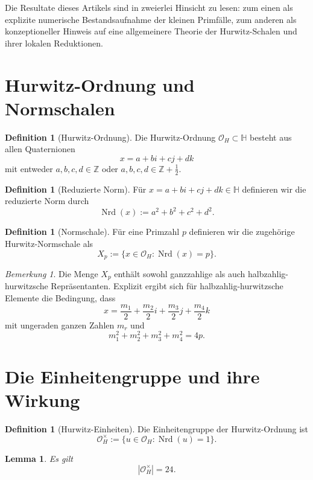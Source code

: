 \documentclass[12pt,a4paper]{article}
\theoremstyle{plain}
\newtheorem{lemma}[satz]{Lemma}
\theoremstyle{definition}
\newtheorem{definition}[satz]{Definition}
\theoremstyle{remark}
\newtheorem{bemerkung}[satz]{Bemerkung}
\newcommand{\OH}{\mathcal O_H}
\newcommand{\QH}{\mathbb H}
\newcommand{\Z}{\mathbb Z}
\newcommand{\nrd}{\operatorname{Nrd}}
\begin{document}
	Die Resultate dieses Artikels sind in zweierlei Hinsicht zu lesen: zum einen als explizite numerische
	Bestandsaufnahme der kleinen Primfälle, zum anderen als konzeptioneller Hinweis auf eine allgemeinere
	Theorie der Hurwitz-Schalen und ihrer lokalen Reduktionen.
	
	\section{Hurwitz-Ordnung und Normschalen}
	
	\begin{definition}[Hurwitz-Ordnung]
		Die Hurwitz-Ordnung \(\OH\subset \QH\) besteht aus allen Quaternionen
		\[
		x=a+bi+cj+dk
		\]
		mit entweder \(a,b,c,d\in \Z\) oder \(a,b,c,d\in \Z+\tfrac12\).
	\end{definition}
	
	\begin{definition}[Reduzierte Norm]
		Für \(x=a+bi+cj+dk\in \QH\) definieren wir die reduzierte Norm durch
		\[
		\nrd(x):=a^2+b^2+c^2+d^2.
		\]
	\end{definition}
	
	\begin{definition}[Normschale]
		Für eine Primzahl \(p\) definieren wir die zugehörige Hurwitz-Normschale als
		\[
		X_p := \{x\in \OH : \nrd(x)=p\}.
		\]
	\end{definition}
	
	\begin{bemerkung}
		Die Menge \(X_p\) enthält sowohl ganzzahlige als auch halbzahlig-hurwitzsche Repräsentanten.
		Explizit ergibt sich für halbzahlig-hurwitzsche Elemente die Bedingung, dass
		\[
		x=\frac{m_1}{2}+\frac{m_2}{2}i+\frac{m_3}{2}j+\frac{m_4}{2}k
		\]
		mit ungeraden ganzen Zahlen \(m_r\) und
		\[
		m_1^2+m_2^2+m_3^2+m_4^2=4p.
		\]
	\end{bemerkung}
	
	\section{Die Einheitengruppe und ihre Wirkung}
	
	\begin{definition}[Hurwitz-Einheiten]
		Die Einheitengruppe der Hurwitz-Ordnung ist
		\[
		\OH^\times := \{u\in \OH : \nrd(u)=1\}.
		\]
	\end{definition}
	
	\begin{lemma}
		Es gilt
		\[
		|\OH^\times|=24.
		\]
	\end{lemma}
	
\end{document}
